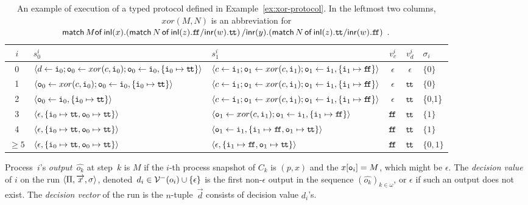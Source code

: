   \begin{sidewaystable}
   \centering
   \caption{An example of execution of a typed protocol defined in
   Example~\ref{ex:xor-protocol}.
   In the leftmost two columns,
   $xor(M,N)$ is an abbreviation for
   $\mathsf{match\,}{M}\mathsf{of}\,\mathsf{inl}({x}).{
  (\mathsf{match}\,{N}\,\mathsf{of}\, \mathsf{inl}({z}). {\texttt{f\kern -1.7pt f}}/ \mathsf{inr}({w}). {\texttt{t\kern -1.2pt t}})
  }\,/ \mathsf{inr}({y}).{
  (\mathsf{match}\,{N}\,\mathsf{of}\, \mathsf{inl}({z}). {\texttt{t\kern -1.2pt t}}/ \mathsf{inr}({w}). {\texttt{f\kern -1.7pt f}})
  }\enspace.$
   }
   \label{table:exec}
   \begin{tabular}{cllcc|l}
    $i$    & $s_0^i$&$s_1^i$ &$v_c^i$ &$v_d^i$ & $\sigma_i$ \\ \hline
    0      & $\langle{d\leftarrow \texttt{i}_0; \texttt{o}_0\leftarrow xor(c, \texttt{i}_0); \texttt{o}_0
   \leftarrow \texttt{i}_0, \{\texttt{i}_0\mapsto \texttt{t\kern -1.2pt t}\}}\rangle$
	& $\langle{c\leftarrow \texttt{i}_1; \texttt{o}_1\leftarrow xor(c, \texttt{i}_1); \texttt{o}_1
   \leftarrow \texttt{i}_1, \{\texttt{i}_1\mapsto \texttt{f\kern -1.7pt f}\}}\rangle$
	    & $\epsilon$
		& $\epsilon$
		    & $\{0\}$ \\ \hline
    1      & $\langle{\texttt{o}_0\leftarrow
  xor(c, \texttt{i}_0); \texttt{o}_0
   \leftarrow \texttt{i}_0, \{\texttt{i}_0\mapsto \texttt{t\kern -1.2pt t}\}}\rangle$
	& $\langle{c\leftarrow \texttt{i}_1; \texttt{o}_1\leftarrow xor(c, \texttt{i}_1); \texttt{o}_1
   \leftarrow \texttt{i}_1, \{\texttt{i}_1\mapsto \texttt{f\kern -1.7pt f}\}}\rangle$
	    & $\epsilon$
		& $\texttt{t\kern -1.2pt t}$
		    & $\{0\}$ \\ \hline
    2      & $\langle{\texttt{o}_0
   \leftarrow \texttt{i}_0, \{\texttt{i}_0\mapsto \texttt{t\kern -1.2pt t}\}}\rangle$
	& $\langle{c\leftarrow \texttt{i}_1; \texttt{o}_1\leftarrow xor(c, \texttt{i}_1); \texttt{o}_1
   \leftarrow \texttt{i}_1, \{\texttt{i}_1\mapsto \texttt{f\kern -1.7pt f}\}}\rangle$
	    & $\epsilon$
		& $\texttt{t\kern -1.2pt t}$
		    & \{0,1\} \\ \hline
    3      & $\langle{\epsilon, \{\texttt{i}_0\mapsto \texttt{t\kern -1.2pt t}, \texttt{o}_0 \mapsto \texttt{t\kern -1.2pt t}\}}\rangle$
	& $\langle{\texttt{o}_1\leftarrow xor(c, \texttt{i}_1); \texttt{o}_1
   \leftarrow \texttt{i}_1, \{\texttt{i}_1\mapsto \texttt{f\kern -1.7pt f}\}}\rangle$
	    & $\texttt{f\kern -1.7pt f}$
		& $\texttt{t\kern -1.2pt t}$
		    & $\{1\}$ \\ \hline
    4      & $\langle{\epsilon, \{\texttt{i}_0\mapsto \texttt{t\kern -1.2pt t}, \texttt{o}_0 \mapsto \texttt{t\kern -1.2pt t}\}}\rangle$
	& $\langle{\texttt{o}_1
   \leftarrow \texttt{i}_1, \{\texttt{i}_1\mapsto \texttt{f\kern -1.7pt f}, \texttt{o}_1\mapsto \texttt{t\kern -1.2pt t}\}}\rangle$
	    & $\texttt{f\kern -1.7pt f}$
		& $\texttt{t\kern -1.2pt t}$
		    & $\{1\}$\\ \hline
    $\ge 5$& $\langle{\epsilon, \{\texttt{i}_0\mapsto \texttt{t\kern -1.2pt t}, \texttt{o}_0 \mapsto \texttt{t\kern -1.2pt t}\}}\rangle$
	& $\langle{\epsilon, \{\texttt{i}_1\mapsto \texttt{f\kern -1.7pt f}, \texttt{o}_1\mapsto \texttt{t\kern -1.2pt t}\}}\rangle$
	    & $\texttt{f\kern -1.7pt f}$
		& $\texttt{t\kern -1.2pt t}$
		    & $\{0,1\}$ \\ \hline
   \end{tabular}
  \end{sidewaystable}

Process~$i$'s \textit{output}~$\hat{o_k}$ at step~$k$ is
$M$ if the $i$-th process snapshot of $C_k$ is
$(p, x)$ and the $x[\texttt{o}_i] = M$, which might be $\epsilon$.
The \textit{decision value}
of $i$ on the run $\langle{\Pi,\overrightarrow x,\sigma}\rangle$,
denoted~$d_i \in \mathcal{V}^-(o_i)\cup\{\epsilon\}$
 is the first non-$\epsilon$ output in the sequence
 $\left(\hat{o_k}\right)_{k\in\omega}$,
 or
$\epsilon$ if such an output does not exist.
The \textit{decision vector} of the run is
the $n$-tuple~$\vec d$ consists of decision value $d_i$'s.

